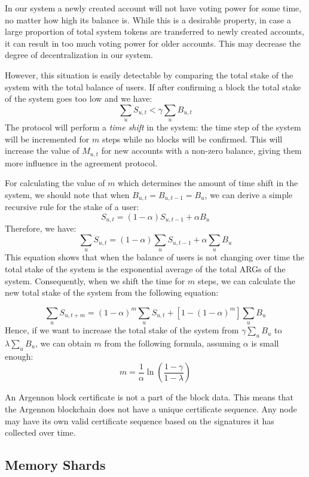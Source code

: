 In our system a newly created account will not have voting power for some time, no matter how high its
balance is. While this is a desirable property, in case a large proportion of total system tokens are
transferred to newly created accounts, it can result in too much voting power for older accounts. This may decrease
the degree of decentralization in our system.

However, this situation is easily detectable by comparing the total stake of the system with the total balance of
users. If after confirming a block the total stake of the system goes too low and we have:
\[
    \sum_{u}S_{u,t} < \gamma \sum_{u}B_{u,t}
\]
The protocol will perform a \emph{time shift} in the system: the time step of the system
will be incremented for \(m\) steps while no blocks will be confirmed. This will increase the value of \(M_{u,t}\)
for new accounts with a non-zero balance, giving them more influence in the agreement protocol.

For calculating the value of \(m\) which determines the amount of time shift in the system, we should note that when
\(B_{u,t} = B_{u, t-1} = B_u\), we can derive a simple recursive rule for the stake of a user:
\[
    S_{u,t} = (1 - \alpha) S_{u,t-1} + \alpha B_u
\]
Therefore, we have:
\[
    \sum_{u}S_{u,t} = (1 - \alpha) \sum_{u}S_{u,t - 1} + \alpha \sum_{u}B_u
\]
This equation shows that when the balance of users is not changing over time the total stake of the system is the
exponential average of the total ARGs of the system. Consequently, when we shift the time for \(m\) steps, we can
calculate the new total stake of the system from the following equation:

\[
    \sum_{u}S_{u,t+m} = (1 - \alpha)^{m}\sum_{u}S_{u,t} + [1 - (1 - \alpha)^{m}]\sum_{u}B_u
\]
Hence, if we want to increase the total stake of the system from \(\gamma \sum_{u}B_u\) to \(\lambda \sum_{u}B_u\),
we can obtain \(m\) from the following formula, assuming \(\alpha\) is small enough:
\[
    m = \frac{1}{\alpha} \ln \left(\frac{1 - \gamma}{1 - \lambda}\right)
\]

An Argennon block certificate is not a part of the block data. This means that the Argennon blockchain does not have a
unique certificate sequence. Any node may have its own valid certificate sequence based on the signatures
it has collected over time.




\subsection{Memory Shards}\label{subsec:memory-shards}

